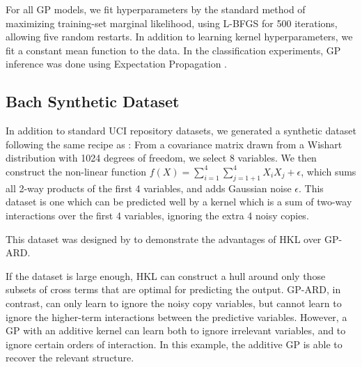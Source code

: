 For all GP models, we fit hyperparameters by the standard method of maximizing training-set marginal likelihood, using L-BFGS \cite{nocedal1980updating} for 500 iterations, allowing five random restarts.  In addition to learning kernel hyperparameters, we fit a constant mean function to the data.
%
In the classification experiments, GP inference was done using Expectation Propagation \cite{minka2001expectation}.

\subsection{Bach Synthetic Dataset}
In addition to standard UCI repository datasets, we generated a synthetic dataset following the same recipe as \cite{DBLP:journals/corr/abs-0909-0844}: From a covariance matrix drawn from a Wishart distribution with 1024 degrees of freedom, we select 8 variables.  We then construct the non-linear function $f(X) = \sum_{i=1}^4 \sum_{j=1+1}^4 X_i X_j + \epsilon$, which sums all 2-way products of the first 4 variables, and adds Gaussian noise $\epsilon$.  This dataset is one which can be predicted well by a kernel which is a sum of two-way interactions over the first 4 variables, ignoring the extra 4 noisy copies.

This dataset was designed by \cite{DBLP:journals/corr/abs-0909-0844} to demonstrate the advantages of HKL over GP-ARD. 

 If the dataset is large enough, HKL can construct a hull around only those subsets of cross terms that are optimal for predicting the output.  GP-ARD, in contrast, can only learn to ignore the noisy copy variables, but cannot learn to ignore the higher-term interactions between the predictive variables.  However, a GP with an additive kernel can learn both to ignore irrelevant variables, and to ignore certain orders of interaction.  In this example, the additive GP is able to recover the relevant structure.

%

 
